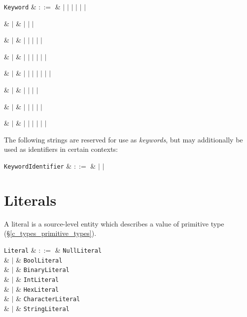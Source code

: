 \begin{syntax}
\verb+Keyword+ & $::=$ &  $|$  $|$
 $|$  $|$  $|$ 
$|$ \\

{\huge\strut} & $|$ &  $|$  $|$  $|$ \\
{\huge\strut} & $|$ &  $|$  $|$  $|$  $|$  $|$ \\
{\huge\strut} & $|$ &  $|$  $|$  $|$  $|$  $|$  $|$  \\
{\huge\strut} & $|$ &  $|$  $|$  $|$  $|$  $|$  $|$  $|$  \\
{\huge\strut} & $|$ &   $|$  $|$  $|$  $|$ \\
{\huge\strut} & $|$ &  $|$  $|$  $|$  $|$  $|$ \\
{\huge\strut} & $|$ &  $|$  $|$  $|$  $|$  $|$  $|$ \\
\end{syntax}

The following strings are reserved for use as {\em keywords}, but may additionally be used as identifiers in certain contexts:
\begin{syntax}
\verb+KeywordIdentifier+ & $::=$ &  $|$  $|$ \\
\end{syntax}



\section{Literals}

A \gls{literal} is a source-level entity which describes a value of primitive type (\S\ref{c_types_primitive_types}).

\begin{syntax}
\verb+Literal+ & $::=$ &  \verb+NullLiteral+ \\
  & $|$ & \verb+BoolLiteral+ \\
  & $|$ & \verb+BinaryLiteral+ \\
  & $|$ & \verb+IntLiteral+ \\
  & $|$ & \verb+HexLiteral+ \\
  & $|$ & \verb+CharacterLiteral+ \\
  & $|$ & \verb+StringLiteral+ \\
\\
\end{syntax}


